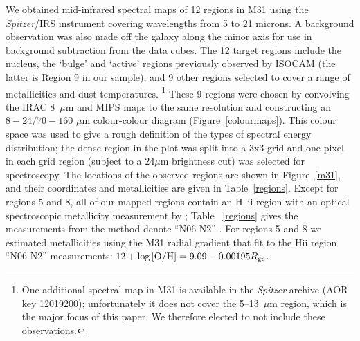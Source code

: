 We obtained mid-infrared spectral maps of 12 regions in M31 using the {\em Spitzer}/IRS instrument \citep{IRS2004} covering wavelengths from 5 to 21 microns. 
A background observation was also made off the galaxy 
along the minor axis for use in background subtraction from the data cubes.
The 12 target regions include the nucleus, the `bulge' and `active' regions previously observed by ISOCAM (the latter is Region 9 in our sample), 
and 9 other regions selected to cover a range of metallicities and dust temperatures.%
\footnote{One additional spectral map in M31 is available in the {\it Spitzer} archive (AOR key 12019200);
unfortunately it does not cover the 5--13~$\mu$m region, which is the major focus of this paper. We therefore elected to not include these observations.} 
These 9 regions were chosen by convolving the IRAC 8~$\mu$m \citep{Barmby2006lr}
and MIPS \citep{gordon06a} maps to the same resolution and constructing an $8 - 24/70 - 160$ $\mu$m colour-colour diagram (Figure~\ref{colourmaps}).
This colour space was used to give a rough definition of the types of spectral energy distribution; the 
dense region in the plot was split into a 3x3 grid and one pixel in each grid region (subject to a 24$\mu$m brightness cut)
was selected for spectroscopy. 
The locations of the observed regions are shown in Figure~\ref{m31}, and 
their coordinates and metallicities are given in Table~\ref{regions}.  
Except for regions 5 and 8, all of our mapped regions contain an  H~{\sc ii} region with
an optical spectroscopic metallicity measurement by \citet{Sanders_2011}; Table ~\ref{regions} gives the measurements from the method 
\citet{Sanders_2011} denote ``N06 N2''  \citep{Nagao2006}. For regions 5 and 8 we estimated metallicities using the M31 radial gradient
that  \citet{Sanders_2011} fit to the H{\sc ii} region ``N06 N2'' measurements: $12+\log{\rm [O/H]} = 9.09 - 0.00195 R_{\rm gc}$.

